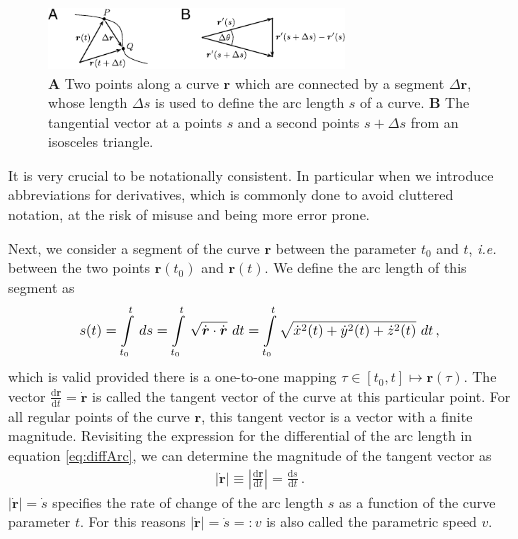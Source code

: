 \documentclass[11pt, DINA4, fleqn]{amsart}
\def\df{\mathrm{d}\xspace}
\newcommand{\dd}[2]{\frac{\df#1}{\df#2}}
\def\vr{\boldsymbol{r}\xspace}
\def\vrd{\dot{\vr}\xspace}
\begin{document}
\begin{figure}[h]
\centering
\includegraphics[width=0.70\textwidth]{./figures/figure_01}
\caption{\textbf{A} Two points along a curve $\vr$ which are connected by a segment $\Delta\vr$, whose length $\Delta s$ is used to define the arc length $s$ of a curve. \textbf{B} The tangential vector at a points $s$ and a second points $s+\Delta s$ from an isosceles triangle.}
\label{fig:figure_01}
\end{figure}

It is very crucial to be notationally consistent.
In particular when we introduce abbreviations for derivatives, which is commonly done to avoid cluttered notation, at the risk of misuse and being more error prone.

Next, we consider a segment of the curve $\vr$ between the parameter $t_0$ and $t$, \textit{i.e.} between the two points $\vr(t_0)$ and $\vr(t)$.
We define the arc length of this segment as
\begin{align}
s(t) = \int\displaylimits_{t_0}^{t} \, ds = \int\displaylimits_{t_0}^{t} \,
\sqrt{\vrd \cdot \vrd} \,\, dt
= \int\displaylimits_{t_0}^{t}\sqrt{\dot{x}^2(t) + \dot{y}^2(t) + \dot{z}^2(t)} \,\, dt \, ,
\label{eq:arcLength}
\end{align}
which is valid provided there is a one-to-one mapping $\tau \in[t_0,t] \longmapsto \vr(\tau)$.
The vector $\dd{\vr}{t} = \vrd$ is called the tangent vector of the curve at this particular point. For all regular points of the curve $\vr$, this tangent vector is a vector with a finite magnitude. Revisiting the expression for the differential of the arc length in equation \eqref{eq:diffArc}, we can determine the magnitude of the tangent vector as
\begin{align}
\left|\vrd\right| \equiv \left|\dd{\vr}{t}\right| = \dd{s}{t} \, .
\end{align}
$|\vrd| = \dot{s}$ specifies the rate of change of the arc length $s$ as a function of the curve parameter $t$. For this reasons $|\vrd| = \dot{s} =:v$ is also called the parametric speed $v$.
\end{document}
